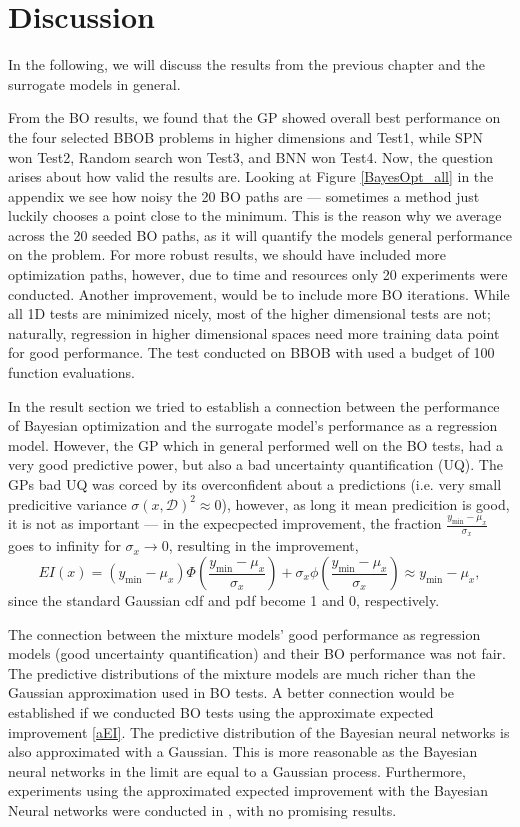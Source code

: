\chapter{Discussion}
In the following, we will discuss the results from the previous chapter and the
surrogate models in general. 

From the BO results, we found that the GP showed overall best performance on the four selected BBOB
problems in higher dimensions and Test1, while SPN won Test2, Random search won Test3, and BNN won
Test4. Now, the question arises about how valid the results are. Looking at Figure
\ref{BayesOpt_all} in the appendix we see how noisy the 20 BO paths are --- sometimes a method just
luckily chooses a point close to the minimum. This is the reason why we average across the 20 seeded
BO paths, as it will quantify the models general performance on the problem. For more robust
results, we should have included more optimization paths, however, due to time and resources only 20
experiments were conducted. Another improvement, would be to include more BO iterations. While all
1D tests are minimized nicely, most of the higher dimensional tests are not; naturally, regression
in higher dimensional spaces need more training data point for good performance. The test conducted
on BBOB with \cite{PhDthesis} used a budget of 100 function evaluations. 

In the result section we tried to establish a connection between the performance of Bayesian
optimization and the surrogate model's performance as a regression model. However, the GP which in
general performed well on the BO tests, had a very good predictive power, but also a bad uncertainty
quantification (UQ). The GPs bad UQ was corced by its overconfident about a predictions (i.e. very
small predicitive variance $\sigma(x,\mathcal{D})^2 \approx 0$), however, as long it mean
predicition is good, it is not as important --- in the expecpected improvement, the fraction
$\frac{y_{\min}-\mu_x}{\sigma_x}$ goes to infinity for $\sigma_x \rightarrow 0$, resulting in the
improvement, 
$$EI(x) = (y_{\min}-\mu_x)\Phi\left(\frac{y_{\min}-\mu_x}{\sigma_x}\right)+ \sigma_x
\phi\left(\frac{y_{\min}-\mu_x}{\sigma_x}\right) \approx y_{\min}-\mu_x,$$ since the standard
Gaussian cdf and pdf become 1 and 0, respectively. 

The connection between the mixture models' good performance as regression models (good uncertainty
quantification) and their BO performance was not fair. The predictive distributions of the mixture
models are much richer than the Gaussian approximation used in BO tests. A better connection would
be established if we conducted BO tests using the approximate expected improvement \eqref{aEI}. The
predictive distribution of the Bayesian neural networks is also approximated with a Gaussian. This
is more reasonable as the Bayesian neural networks in the limit are equal to a Gaussian process.
Furthermore, experiments using the approximated expected improvement with the Bayesian Neural
networks were conducted in \cite{PhDthesis}, with no promising results. 

